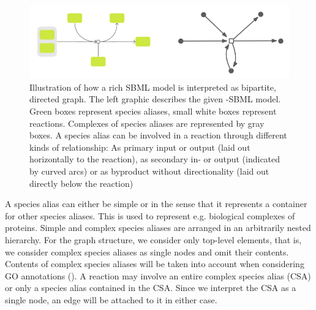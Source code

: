 \documentclass[
	fontsize=10pt, %
	twoside=false, %
	secnumdepth=1, %
  toc=indentunnumbered %
]{kaobook}
\begin{document}
\begin{figure}[h]
  \centering
  \includegraphics[width=0.7\linewidth]{graph-interpretation.png}
  \caption[Illustration how a rich SBML model is interpreted as a
  graph.]{Illustration of how a rich SBML model is interpreted as bipartite,
    directed graph. The left graphic describes the given -SBML model. Green
    boxes represent species aliases, small white boxes represent reactions.
    Complexes of species aliases are represented by gray boxes. A species alias
    can be involved in a reaction through different kinds of relationship: As
    primary input or output (laid out horizontally to the reaction), as
    secondary in- or output (indicated by curved arcs) or as byproduct without
    directionality (laid out directly below the reaction)}
  \label{fig:graph-construction}
\end{figure}



A species alias can either be simple or  in the sense that it
represents a container for other species aliases. This is used to represent e.g.
biological complexes of proteins. Simple and complex species aliases are
arranged in an arbitrarily nested hierarchy. For the graph structure, we
consider only top-level elements, that is, we consider complex species aliases
as single nodes and omit their contents. Contents of complex species aliases
will be taken into account when considering GO annotations
(). A reaction may involve an entire complex species
alias (CSA) or only a species alias contained in the CSA. Since we interpret the
CSA as a single node, an edge will be attached to it in either case.
\end{document}
